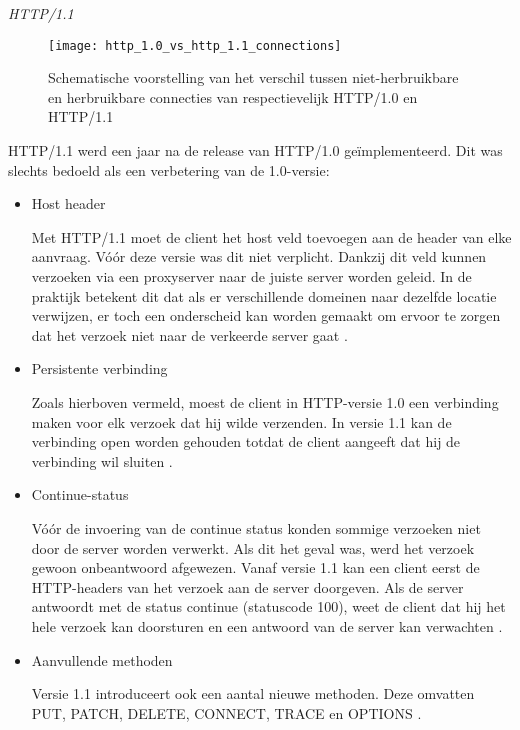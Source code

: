 \emph{HTTP/1.1}
\begin{figure}
    \texttt{[image: http\_1.0\_vs\_http\_1.1\_connections]}
    \centering
    \caption[Schematische voorstelling van het verschil tussen niet-herbruikbare en herbruikbare connecties van respectievelijk HTTP/1.0 en HTTP/1.1]{Schematische voorstelling van het verschil tussen niet-herbruikbare en herbruikbare connecties van respectievelijk HTTP/1.0 en HTTP/1.1 \autocite{Hesham2019}}
    \label{fig:httpConnectionScheme}
\end{figure}

HTTP/1.1 werd een jaar na de release van HTTP/1.0 geïmplementeerd. Dit was slechts bedoeld als een verbetering van de 1.0-versie:

\begin{itemize}
    \item Host header
    
    Met HTTP/1.1 moet de client het host veld toevoegen aan de header van elke aanvraag. Vóór deze versie was dit niet verplicht. Dankzij dit veld kunnen verzoeken via een proxyserver naar de juiste server worden geleid. In de praktijk betekent dit dat als er verschillende domeinen naar dezelfde locatie verwijzen, er toch een onderscheid kan worden gemaakt om ervoor te zorgen dat het verzoek niet naar de verkeerde server gaat \autocite{FulberGarcia2022}.
    
    \item Persistente verbinding
    
    Zoals hierboven vermeld, moest de client in HTTP-versie 1.0 een verbinding maken voor elk verzoek dat hij wilde verzenden. In versie 1.1 kan de verbinding open worden gehouden totdat de client aangeeft dat hij de verbinding wil sluiten \autocite{MDN2023a}.
    
    \item Continue-status
    
    Vóór de invoering van de continue status konden sommige verzoeken niet door de server worden verwerkt. Als dit het geval was, werd het verzoek gewoon onbeantwoord afgewezen. Vanaf versie 1.1 kan een client eerst de HTTP-headers van het verzoek aan de server doorgeven. Als de server antwoordt met de status continue (statuscode 100), weet de client dat hij het hele verzoek kan doorsturen en een antwoord van de server kan verwachten \autocite{FulberGarcia2022}.
    
    \item Aanvullende methoden
    
    Versie 1.1 introduceert ook een aantal nieuwe methoden. Deze omvatten PUT, PATCH, DELETE, CONNECT, TRACE en OPTIONS \autocite{FulberGarcia2022}.
\end{itemize}


